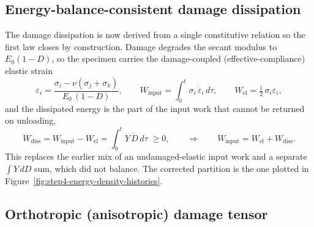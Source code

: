\documentclass[11pt,a4paper,openany]{book}
\theoremstyle{handbook}
\begin{document}
\subsection{Energy-balance-consistent damage dissipation}\label{sec:v6-energy}

The damage dissipation is now derived from a single constitutive relation so the
first law closes by construction. Damage degrades the secant modulus to
$E_0(1-D)$, so the specimen carries the damage-coupled (effective-compliance)
elastic strain
%
\begin{equation}
\varepsilon_i=\frac{\sigma_i-\nu(\sigma_j+\sigma_k)}{E_0\,(1-D)},\qquad
W_{\mathrm{input}}=\int_0^t \sigma_i\,\dot\varepsilon_i\,d\tau,\qquad
W_{\mathrm{el}}=\tfrac12\,\sigma_i\varepsilon_i,
\end{equation}
%
and the dissipated energy is the part of the input work that cannot be returned
on unloading,
%
\begin{equation}
W_{\mathrm{diss}}=W_{\mathrm{input}}-W_{\mathrm{el}}=\int_0^t Y\,\dot D\,d\tau\;\ge 0,
\qquad\Longrightarrow\qquad W_{\mathrm{input}}=W_{\mathrm{el}}+W_{\mathrm{diss}}.
\end{equation}
%
This replaces the earlier mix of an undamaged-elastic input work and a separate
$\int Y\,dD$ sum, which did not balance. The corrected partition is the one
plotted in Figure~\ref{fig:step4-energy-density-histories}.

\subsection{Orthotropic (anisotropic) damage tensor}\label{sec:v6-orthotropic}
\end{document}
